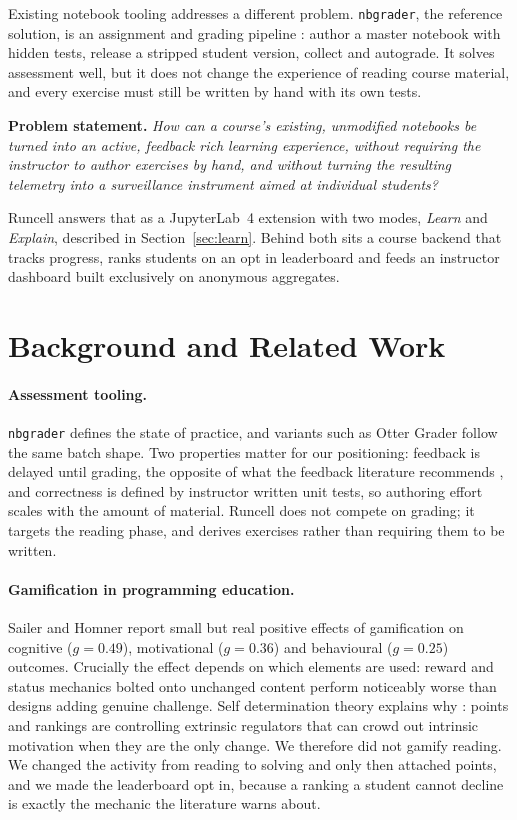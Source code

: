 \documentclass[manuscript]{acmart}
\begin{document}
Existing notebook tooling addresses a different problem. \texttt{nbgrader}, the
reference solution, is an assignment and grading pipeline
\cite{blank2019nbgrader}: author a master notebook with hidden tests, release a
stripped student version, collect and autograde. It solves assessment well, but
it does not change the experience of reading course material, and every
exercise must still be written by hand with its own tests.

\medskip
\noindent\textbf{Problem statement.} \emph{How can a course's existing,
unmodified notebooks be turned into an active, feedback rich learning
experience, without requiring the instructor to author exercises by hand, and
without turning the resulting telemetry into a surveillance instrument aimed at
individual students?}

\medskip
Runcell answers that as a JupyterLab~4 extension with two modes, \emph{Learn}
and \emph{Explain}, described in Section~\ref{sec:learn}. Behind both sits a
course backend that tracks progress, ranks students on an opt in leaderboard
and feeds an instructor dashboard built exclusively on anonymous aggregates.

\section{Background and Related Work}
\label{sec:related}

\paragraph{Assessment tooling.}
\texttt{nbgrader} \cite{blank2019nbgrader} defines the state of practice, and
variants such as Otter Grader follow the same batch shape. Two properties
matter for our positioning: feedback is delayed until grading, the opposite of
what the feedback literature recommends \cite{hattie2007power}, and correctness
is defined by instructor written unit tests, so authoring effort scales with
the amount of material. Runcell does not compete on grading; it targets the
reading phase, and derives exercises rather than requiring them to be written.

\paragraph{Gamification in programming education.}
Sailer and Homner \cite{sailer2020gamification} report small but real positive
effects of gamification on cognitive ($g = 0.49$), motivational ($g = 0.36$)
and behavioural ($g = 0.25$) outcomes. Crucially the effect depends on which
elements are used: reward and status mechanics bolted onto unchanged content
perform noticeably worse than designs adding genuine challenge. Self
determination theory explains why \cite{ryan2000selfdetermination}: points and
rankings are controlling extrinsic regulators that can crowd out intrinsic
motivation when they are the only change. We therefore did not gamify reading.
We changed the activity from reading to solving and only then attached points,
and we made the leaderboard opt in, because a ranking a student cannot decline
is exactly the mechanic the literature warns about.
\end{document}
